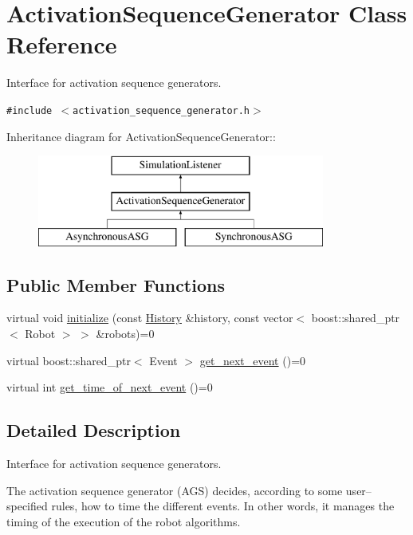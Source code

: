 \hypertarget{class_activation_sequence_generator}{
\section{ActivationSequenceGenerator Class Reference}
\label{class_activation_sequence_generator}
}
Interface for activation sequence generators.  


{\tt \#include $<$activation\_\-sequence\_\-generator.h$>$}

Inheritance diagram for ActivationSequenceGenerator::\begin{figure}[H]
\begin{center}
\leavevmode
\includegraphics[height=3cm]{class_activation_sequence_generator}
\end{center}
\end{figure}
\subsection*{Public Member Functions}
\begin{CompactItemize}
\item 
virtual void \hyperlink{class_activation_sequence_generator_01592eb2b4293512d2ad00dc4adf0361}{initialize} (const \hyperlink{class_history}{History} \&history, const vector$<$ boost::shared\_\-ptr$<$ Robot $>$ $>$ \&robots)=0
\item 
virtual boost::shared\_\-ptr$<$ Event $>$ \hyperlink{class_activation_sequence_generator_cf20a8caaee580655c57b8843d82d5f5}{get\_\-next\_\-event} ()=0
\item 
virtual int \hyperlink{class_activation_sequence_generator_724cfa2e135813db7becb90af1783050}{get\_\-time\_\-of\_\-next\_\-event} ()=0
\end{CompactItemize}


\subsection{Detailed Description}
Interface for activation sequence generators. 

The activation sequence generator (AGS) decides, according to some user--specified rules, how to time the different events. In other words, it manages the timing of the execution of the robot algorithms.

